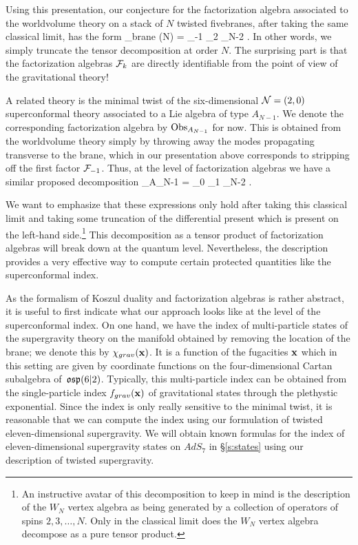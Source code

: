 Using this presentation, our conjecture for the factorization algebra associated to the worldvolume theory on a stack of $N$ twisted fivebranes, after taking the same classical limit, has the form
\beqn\label{eqn:finiteTensor}
\Obs_{brane} (N) = \cF_{-1} \otimes \cF_2 \otimes \cdots \otimes \cF_{N-2} .
\eeqn
In other words, we simply truncate the tensor decomposition at order $N$.
The surprising part is that the factorization algebras $\mathcal F_k$ are directly identifiable from the point of view of the gravitational theory!

A related theory is the minimal twist of the six-dimensional $\mathcal N=(2,0)$ superconformal theory associated to a Lie algebra of type $A_{N-1}$.
We denote the corresponding factorization algebra by $\operatorname{Obs}_{A_{N-1}}$ for now. 
This is obtained from the worldvolume theory simply by throwing away the modes propagating transverse to the brane, which in our presentation above corresponds to stripping off the first factor $\mathcal F_{-1}$. 
Thus, at the level of factorization algebras we have a similar proposed decomposition
\beqn
\Obs_{A_{N-1}} = \cF_0 \otimes \cF_1 \otimes \cdots \otimes \cF_{N-2} .
\eeqn

We want to emphasize that these expressions only hold after taking this classical limit and taking some truncation of the differential present which is present on the left-hand side.\footnote{An instructive avatar of this decomposition to keep in mind is the description of the $W_N$ vertex algebra as being generated by a collection of operators of spins $2,3,\ldots, N$.
Only in the classical limit does the $W_N$ vertex algebra decompose as a pure tensor product.}
This decomposition as a tensor product of factorization algebras will break down at the quantum level.
Nevertheless, the description provides a very effective way to compute certain protected quantities like the superconformal index.

As the formalism of Koszul duality and factorization algebras is rather abstract, it is useful to first indicate what our approach looks like at the level of the superconformal index. 
On one hand, we have the index of multi-particle states of the supergravity theory on the manifold obtained by removing the location of the brane; we denote this by $\chi_{grav}({\bf x})$.
It is a function of the fugacities ${\bf x}$ which in this setting are given by coordinate functions on the four-dimensional Cartan subalgebra of~$\mathfrak{osp}(6|2)$.
Typically, this multi-particle index can be obtained from the single-particle index $f_{grav}({\bf x})$ of gravitational states through the plethystic exponential. 
Since the index is only really sensitive to the minimal twist, it is reasonable that we can compute the index using our formulation of twisted eleven-dimensional supergravity.
We will obtain known formulas for the index of eleven-dimensional supergravity states on $AdS_7$ in \S\ref{s:states} using our description of twisted supergravity. 

